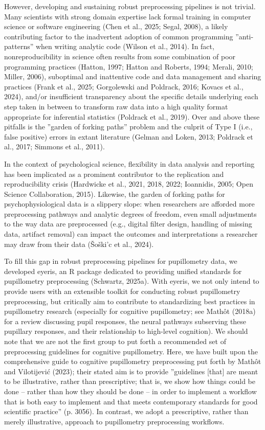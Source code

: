 However, developing and sustaining robust preprocessing pipelines is not trivial. Many scientists with strong domain expertise lack formal training in computer science or software engineering (Chen et al., 2025; Segal, 2008), a likely contributing factor to the inadvertent adoption of common programming ”anti-patterns” when writing analytic code (Wilson et al., 2014). In fact, nonreproducibility in science often results from some combination of poor programming practices (Hatton, 1997; Hatton and Roberts, 1994; Merali, 2010; Miller, 2006), suboptimal and inattentive code and data management and sharing practices (Frank et al., 2025; Gorgolewski and Poldrack, 2016; Kovacs et al., 2024), and/or insufficient transparency about the specific details underlying each step taken in between to transform raw data into a high quality format appropriate for inferential statistics (Poldrack et al., 2019). Over and above these pitfalls is the ”garden of forking paths” problem and the culprit of Type I (i.e., false positive) errors in extant literature (Gelman and Loken, 2013; Poldrack et al., 2017; Simmons et al., 2011).

In the context of psychological science, flexibility in data analysis and reporting has been implicated as a prominent contributor to the replication and reproducibility crisis (Hardwicke et al., 2021, 2018, 2022; Ioannidis, 2005; Open Science Collaboration, 2015). Likewise, the garden of forking paths for psychophysiological data is a slippery slope: when researchers are afforded more preprocessing pathways and analytic degrees of freedom, even small adjustments to the way data are preprocessed (e.g., digital filter design, handling of missing data, artifact removal) can impact the outcomes and interpretations a researcher may draw from their data (Šoški’c et al., 2024).

To fill this gap in robust preprocessing pipelines for pupillometry data, we developed eyeris, an R package dedicated to providing unified standards for pupillometry preprocessing (Schwartz, 2025a). With eyeris, we not only intend to provide users with an extensible toolkit for conducting robust pupillometry preprocessing, but critically aim to contribute to standardizing best practices in pupillometry research (especially for cognitive pupillometry; see Mathôt (2018a) for a review discussing pupil responses, the neural pathways subserving these pupillary responses, and their relationship to high-level cognition). We should note that we are not the first group to put forth a recommended set of preprocessing guidelines for cognitive pupillometry. Here, we have built upon the comprehensive guide to cognitive pupillometry preprocessing put forth by Mathôt and Vilotijević (2023); their stated aim is to provide ”guidelines [that] are meant to be illustrative, rather than prescriptive; that is, we show how things could be done – rather than how they should be done – in order to implement a workflow that is both easy to implement and that meets contemporary standards for good scientific practice” (p. 3056). In contrast, we adopt a prescriptive, rather than merely illustrative, approach to pupillometry preprocessing workflows.

